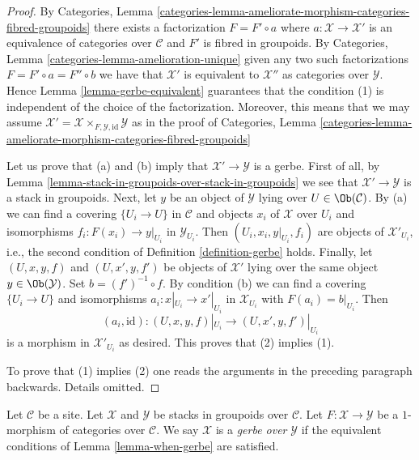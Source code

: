 \begin{proof}
By
Categories, Lemma
\ref{categories-lemma-ameliorate-morphism-categories-fibred-groupoids}
there exists a factorization $F = F' \circ a$ where
$a : \mathcal{X} \to \mathcal{X}'$ is an equivalence of categories over
$\mathcal{C}$ and $F'$ is fibred in groupoids. By
Categories, Lemma \ref{categories-lemma-amelioration-unique}
given any two such factorizations $F = F' \circ a = F'' \circ b$
we have that $\mathcal{X}'$ is equivalent to $\mathcal{X}''$ as
categories over $\mathcal{Y}$. Hence
Lemma \ref{lemma-gerbe-equivalent}
guarantees that the condition (1) is independent of the choice of the
factorization. Moreover, this means that we may assume
$\mathcal{X}' = \mathcal{X} \times_{F, \mathcal{Y}, \text{id}} \mathcal{Y}$
as in the proof of
Categories, Lemma
\ref{categories-lemma-ameliorate-morphism-categories-fibred-groupoids}

\medskip\noindent
Let us prove that (a) and (b) imply that $\mathcal{X}' \to \mathcal{Y}$
is a gerbe. First of all, by
Lemma \ref{lemma-stack-in-groupoids-over-stack-in-groupoids}
we see that $\mathcal{X}' \to \mathcal{Y}$ is a stack in groupoids.
Next, let $y$ be an object of $\mathcal{Y}$ lying over
$U \in \Ob(\mathcal{C})$. By (a) we can find a covering
$\{U_i \to U\}$ in $\mathcal{C}$ and objects $x_i$ of $\mathcal{X}$
over $U_i$ and isomorphisms $f_i : F(x_i) \to y|_{U_i}$ in
$\mathcal{Y}_{U_i}$. Then $(U_i, x_i, y|_{U_i}, f_i)$ are objects
of $\mathcal{X}'_{U_i}$, i.e., the second condition of
Definition \ref{definition-gerbe}
holds. Finally, let $(U, x, y, f)$ and $(U, x', y, f')$ be objects
of $\mathcal{X}'$ lying over the same object $y \in \Ob(\mathcal{Y})$.
Set $b = (f')^{-1} \circ f$. By condition (b) we can find a covering
$\{U_i \to U\}$ and isomorphisms $a_i : x|_{U_i} \to x'|_{U_i}$
in $\mathcal{X}_{U_i}$ with $F(a_i) = b|_{U_i}$. Then
$$
(a_i, \text{id}) : (U, x, y, f)|_{U_i} \to (U, x', y, f')|_{U_i}
$$
is a morphism in $\mathcal{X}'_{U_i}$ as desired. This proves that
(2) implies (1).

\medskip\noindent
To prove that (1) implies (2) one reads the arguments
in the preceding paragraph backwards. Details omitted.
\end{proof}

\begin{definition}
\label{definition-gerbe-over-stack-in-groupoids}
Let $\mathcal{C}$ be a site. Let $\mathcal{X}$
and $\mathcal{Y}$ be stacks in groupoids over $\mathcal{C}$.
Let $F : \mathcal{X} \to \mathcal{Y}$ be a $1$-morphism of categories
over $\mathcal{C}$. We say $\mathcal{X}$ is a {\it gerbe over} $\mathcal{Y}$
if the equivalent conditions of
Lemma \ref{lemma-when-gerbe}
are satisfied.
\end{definition}

